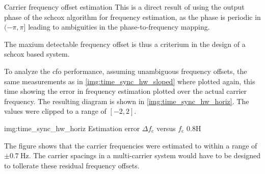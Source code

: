 \begin{subchapter}{Carrier frequency offset estimation}
  This is a direct result of using the output phase
  of the \gls{schcox} algorithm for frequency estimation,
  as the phase is periodic in $(-\pi, \pi]$ leading to
  ambiguities in the phase-to-frequency mapping.

  The maxium detectable frequency offset is thus
  a criterium in the design of a \gls{schcox}
  based system.

  To analyze the \gls{cfo} performance, assuming unambiguous
  frequency offsets, the same measurements
  as in \autoref{img:time_sync_hw_sloped} where plotted
  again, this time showing the error in frequency estimation
  plotted over the actual carrier frequency.
  The resulting diagram is shown in
  \autoref{img:time_sync_hw_horiz}.
  The values were clipped to a range of $[-2, 2]$.

                  {img:time_sync_hw_horiz}
                  {Estimation error $\Delta f_\text{c}$ versus $f_\text{c}$}
                  {0.8}{H}

  The figure shows that the carrier frequencies were
  estimated to within a range of $\pm\SI{0.7}{\hertz}$.
  The carrier spacings in a multi-carrier system
  would have to be designed to tollerate these residual
  frequency offsets.
\end{subchapter}

